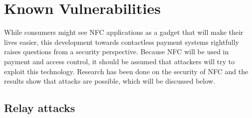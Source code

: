 \section{Known Vulnerabilities}

While consumers might see NFC applications as a gadget that will make their lives easier, this development towards contactless payment systems rightfully raises questions from a security perspective.
Because NFC will be used in payment and access control, it should be assumed that attackers will try to exploit this technology. Research has been done on the security of NFC and the results show that attacks are possible, which will be discussed below.


\subsection{Relay attacks}

